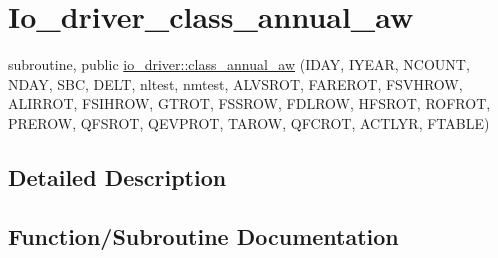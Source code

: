 \hypertarget{group__io__driver__class__annual__aw}{}\section{Io\+\_\+driver\+\_\+class\+\_\+annual\+\_\+aw}
\label{group__io__driver__class__annual__aw}
\begin{DoxyCompactItemize}
\item 
subroutine, public \hyperlink{group__io__driver__class__annual__aw_gae919e8280caba6c80a62cf2bbc168c7d}{io\+\_\+driver\+::class\+\_\+annual\+\_\+aw} (I\+D\+A\+Y, I\+Y\+E\+A\+R, N\+C\+O\+U\+N\+T, N\+D\+A\+Y, S\+B\+C, D\+E\+L\+T, nltest, nmtest, A\+L\+V\+S\+R\+O\+T, F\+A\+R\+E\+R\+O\+T, F\+S\+V\+H\+R\+O\+W, A\+L\+I\+R\+R\+O\+T, F\+S\+I\+H\+R\+O\+W, G\+T\+R\+O\+T, F\+S\+S\+R\+O\+W, F\+D\+L\+R\+O\+W, H\+F\+S\+R\+O\+T, R\+O\+F\+R\+O\+T, P\+R\+E\+R\+O\+W, Q\+F\+S\+R\+O\+T, Q\+E\+V\+P\+R\+O\+T, T\+A\+R\+O\+W, Q\+F\+C\+R\+O\+T, A\+C\+T\+L\+Y\+R, F\+T\+A\+B\+L\+E)
\end{DoxyCompactItemize}


\subsection{Detailed Description}


\subsection{Function/\+Subroutine Documentation}
\hypertarget{group__io__driver__class__annual__aw_gae919e8280caba6c80a62cf2bbc168c7d}{}
